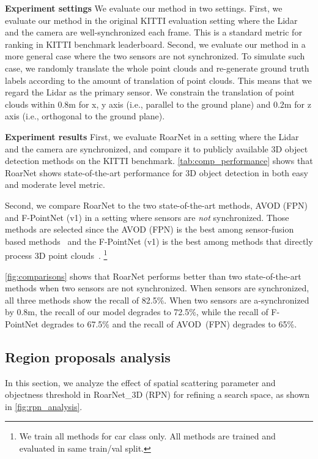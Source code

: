 \documentclass[letterpaper, 10 pt, conference]{ieeeconf}
\newcommand{\subsec}{\quad}
\begin{document}
\textbf{Experiment settings\subsec} We evaluate our method in two settings. First, we evaluate our method in the original KITTI evaluation setting where the Lidar and the camera are well-synchronized each frame. This is a standard metric for ranking in KITTI benchmark leaderboard. Second, we evaluate our method in a more general case where the two sensors are not synchronized.
To simulate such case, we randomly translate the whole point clouds and re-generate ground truth labels according to the amount of translation of point clouds. This means that we regard the Lidar as the primary sensor. We constrain the translation of point clouds within 0.8m for x, y axis (i.e., parallel to the ground plane) and 0.2m for z axis (i.e., orthogonal to the ground plane).

\textbf{Experiment results\subsec} First, we evaluate RoarNet in a setting where the Lidar and the camera are synchronized, and compare it to publicly available 3D object detection methods on the KITTI benchmark. \cref{tab:comp_performance} shows that RoarNet shows state-of-the-art performance for 3D object detection in both easy and moderate level metric.




Second, we compare RoarNet to the two state-of-the-art methods, AVOD (FPN) and F-PointNet (v1) in a setting where sensors are \textit{not} synchronized. Those methods are selected since the AVOD (FPN) is the best among sensor-fusion based methods~\cite{ku_joint_2017} and the F-PointNet (v1) is the best among methods that directly process 3D point clouds~\cite{qi_frustum_2018, zhou2017voxelnet}.
\footnote{We train all methods for car class only. All methods are trained and evaluated in same train/val split.}

\cref{fig:comparisons} shows that RoarNet performs better than two state-of-the-art methods when two sensors are not synchronized. When sensors are synchronized, all three methods show the recall of 82.5\%. When two sensors are a-synchronized by 0.8m, the recall of our model degrades to 72.5\%, while the recall of F-PointNet degrades to 67.5\% and the recall of AVOD~(FPN) degrades to 65\%.

\subsection{Region proposals analysis}
In this section, we analyze the effect of spatial scattering parameter  and objectness threshold in RoarNet\_3D (RPN) for refining a search space, as shown in \cref{fig:rpn_analysis}.
\end{document}
